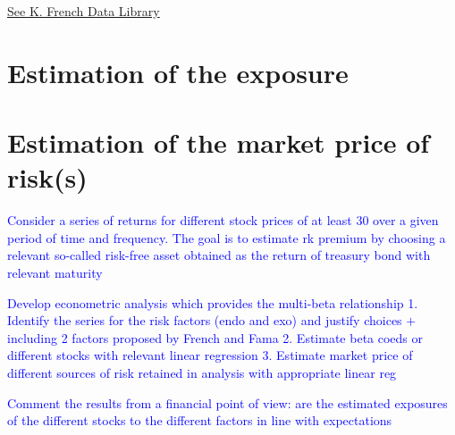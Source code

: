 \documentclass[hidelinks,11pts]{article}
\DeclareMathOperator{\1}{\mathbbm{1}}
\begin{document}
\begin{comment}
    
    The Fama/French factors are constructed using the 6 value-weight portfolios formed on size and book-to-market. (See the description of the 6 size/book-to-market portfolios.)
    
    SMB (Small Minus Big) is the average return on the three small portfolios minus the average return on the three big portfolios,
    
    
    SMB = 1/3 (Small Value + Small Neutral + Small Growth) - 1/3 (Big Value + Big Neutral + Big Growth).	 
    
    HML (High Minus Low) is the average return on the two value portfolios minus the average return on the two growth portfolios,
    
    
    HML = 1/2 (Small Value + Big Value) - 1/2 (Small Growth + Big Growth).	 
    
    Rm-Rf, the excess return on the market, value-weight return of all CRSP firms incorporated in the US and listed on the NYSE, AMEX, or NASDAQ that have a CRSP share code of 10 or 11 at the beginning of month t, good shares and price data at the beginning of t, and good return data for t minus the one-month Treasury bill rate (from Ibbotson Associates).
    
    See Fama and French, 1993, "Common Risk Factors in the Returns on Stocks and Bonds," Journal of Financial Economics, for a complete description of the factor returns.
\end{comment}
    
    
    \href{https://mba.tuck.dartmouth.edu/pages/faculty/ken.french/data_library.html}{See K. French Data Library}


\section{Estimation of the exposure}


\section{Estimation of the market price of risk(s)}


\textcolor{blue}{Consider a series of returns for different stock prices of at least 30 over a given period of time and frequency. The goal is to estimate  rk premium by choosing a relevant so-called  risk-free asset obtained as the return of treasury bond with relevant maturity}

\textcolor{blue}{Develop econometric analysis which provides the multi-beta relationship 1. Identify the series for the risk factors (endo and exo) and justify choices $+$ including 2 factors proposed by French and Fama 2. Estimate beta coeds or different stocks with relevant linear regression 3. Estimate market price of different sources of risk retained in analysis with appropriate linear reg}

\textcolor{blue}{Comment the results from a financial point of view: are the estimated exposures of the different stocks to the different factors in line with expectations}


\end{document}
